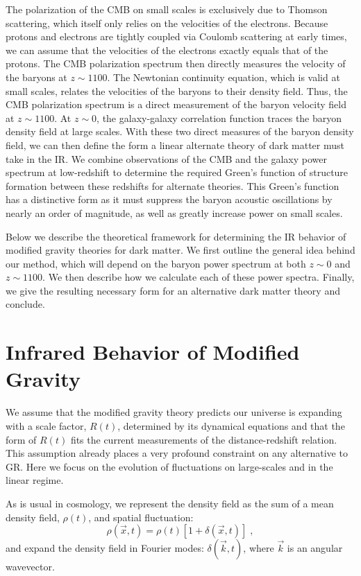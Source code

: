 \documentclass[12pt,floats,floatfix,showpacs,amssymb,amsmath,prl,superscriptaddress,nofootinbib, aps]{revtex4-2}
\begin{document}
The polarization of the CMB on small scales is exclusively due to Thomson scattering, which itself only relies on the velocities of the electrons. Because protons and electrons are tightly coupled via Coulomb scattering at early times, we can assume that the velocities of the electrons exactly equals that of the protons. The CMB polarization spectrum then directly measures the velocity of the baryons at $z\sim1100$. The Newtonian continuity equation, which is valid at small scales, relates the velocities of the baryons to their density field. Thus, the CMB polarization spectrum is a direct measurement of the baryon velocity field at $z\sim 1100$. At $z\sim 0$, the galaxy-galaxy correlation function traces the baryon density field at large scales. With these two direct measures of the baryon density field, we can then define the form a linear alternate theory of dark matter must take in the IR. We combine observations of the CMB and the galaxy power spectrum at low-redshift to determine the required Green's function of structure formation between these redshifts for alternate theories. This Green's function has a distinctive form as it must suppress the baryon acoustic oscillations by nearly an order of magnitude, as well as greatly increase power on small scales. 

Below we describe the theoretical framework for determining the IR behavior of modified gravity theories for dark matter. We first outline the general idea behind our method, which will depend on the baryon power spectrum at both $z\sim 0$ and $z\sim1100$. We then describe how we calculate each of these power spectra. Finally, we give the resulting necessary form for an alternative dark matter theory and conclude.

\section{Infrared Behavior of Modified Gravity}
We assume that the modified gravity theory predicts our universe is expanding with a scale factor, $R(t)$, determined by its dynamical equations and that the form of $R(t)$ fits the current measurements of the distance-redshift relation. This assumption already places a very profound constraint on any alternative to GR. Here we focus on the evolution of fluctuations on large-scales and in the linear regime.

As is usual in cosmology, we represent the density field as the sum of a mean density field, $\rho(t)$, and spatial fluctuation:
\begin{equation}
    \rho(\vec x,t) = \rho(t)\left[1 + \delta(\vec x,t)\right] \; ,
\end{equation}
and expand the density field in Fourier modes: $\delta(\vec k,t)$, where $\vec{k}$ is an angular wavevector.
\end{document}
